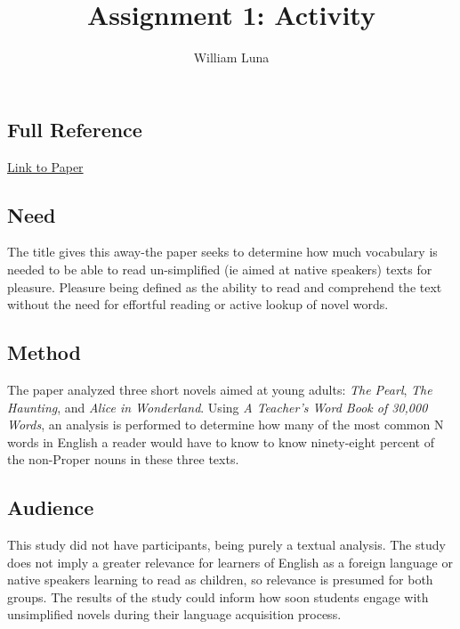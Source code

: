 \documentclass[
	letterpaper, %
]{jdf}
\author{William Luna}
\title{Assignment 1: Activity}
\begin{document}

\maketitle
\section{\cite{nation1992vocabulary}}
\subsection{Full Reference}

\href{https://scholarspace.manoa.hawaii.edu/server/api/core/bitstreams/04d7edf5-be1c-4a1e-9c91-995135ac4120/content}{Link to Paper}

\subsection{Need}
The title gives this away-the paper seeks to determine how much vocabulary is needed to be able to read un-simplified (ie aimed at native speakers) texts for pleasure. Pleasure being defined as the ability to read and comprehend the text without the need for effortful reading or active lookup of novel words.

\subsection{Method}
The paper analyzed three short novels aimed at young adults: \textit{The Pearl}, \textit{The Haunting}, and \textit{Alice in Wonderland}. Using \textit{A Teacher's Word Book of 30,000 Words}, an analysis is performed to determine how many of the most common N words in English a reader would have to know to know ninety-eight percent of the non-Proper nouns in these three texts.

\subsection{Audience}
This study did not have participants, being purely a textual analysis. The study does not imply a greater relevance for learners of English as a foreign language or native speakers learning to read as children, so relevance is presumed for both groups. The results of the study could inform how soon students engage with unsimplified novels during their language acquisition process.
\end{document}
